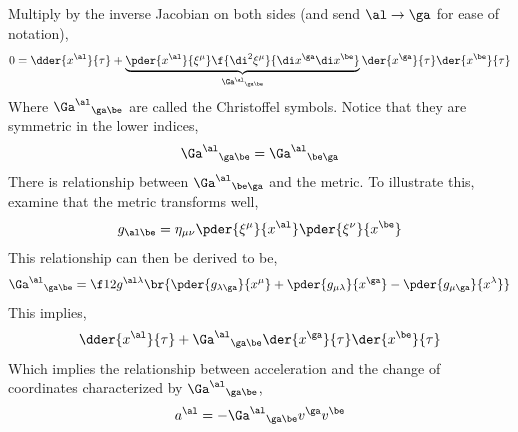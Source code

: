 \documentclass{article}
\begin{document}
Multiply by the inverse Jacobian on both sides (and send $\al \to \ga$ for ease of notation),
\[ 0 = \dder{x^\al}{\tau}  + \underbrace{\pder{x^\al}{\xi^\mu} \f{\di^2\xi^\mu}{\di x^\ga\di x^\be}}_{{\Ga^\al}_{\ga\be}}\der{x^\ga}{\tau}\der{x^\be}{\tau} \]
Where ${\Ga^\al}_{\ga\be}$ are called the Christoffel symbols. Notice that they are symmetric in the lower indices,
\[ {\Ga^\al}_{\ga\be} = {\Ga^\al}_{\be\ga} \]
There is relationship between ${\Ga^\al}_{\be\ga}$ and the metric. To illustrate this, examine that the metric transforms well,
\[ g_{\al\be} = \eta_{\mu\nu} \pder{\xi^\mu}{x^\al}\pder{\xi^\nu}{x^\be} \]
This relationship can then be derived to be,
\[ {\Ga^\al}_{\ga\be} = \f12 g^{\al\lambda}\br{\pder{g_{\lambda\ga}}{x^\mu} + \pder{g_{\mu\lambda}}{x^\ga}-\pder{g_{\mu\ga}}{x^\lambda}} \]
This implies,
\[ \dder{x^\al}{\tau} + {\Ga^\al}_{\ga\be} \der{x^\ga}{\tau} \der{x^\be}{\tau} \]
Which implies the relationship between acceleration and the change of coordinates characterized by ${\Ga^\al}_{\ga\be}$,
\[ a^\al = - {\Ga^\al}_{\ga\be}  v^\ga  v^\be\]
\end{document}
